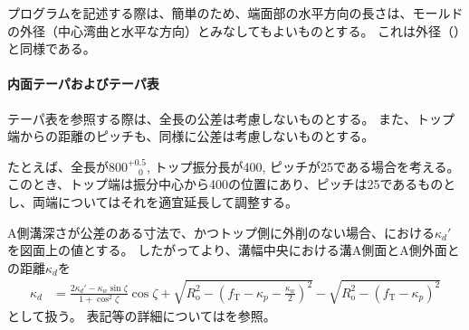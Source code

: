 プログラムを記述する際は、簡単のため、端面部の水平方向の長さは、モールドの外径（中心湾曲と水平な方向）とみなしてもよいものとする。
これは外径（）と同様である。

\paragraph*{内面テーパおよびテーパ表}
テーパ表を参照する際は、全長の公差は考慮しないものとする。
また、トップ端からの距離のピッチも、同様に公差は考慮しないものとする。

たとえば、全長が$800^{+0.5}_{\phantom -0}$, トップ振分長が400, ピッチが25である場合を考える。
このとき、トップ端は振分中心から400の位置にあり、ピッチは25であるものとし、両端についてはそれを適宜延長して調整する。



A側溝深さが公差のある寸法で、かつトップ側に外削のない場合、における$\kappa_d'$を図面上の値とする。
したがってより、溝幅中央における溝A側面とA側外面との距離$\kappa_d$を
\begin{align*}
  \kappa_d
  &= \frac{2\kappa_d'-\kappa_w\sin\zeta}{1+\cos^2\zeta}\cos\zeta
     +\sqrt{R_\mathrm o^2-\left(f_\mathrm T-\kappa_p-\frac{\kappa_w}2\right)^{\!2}}
     -\sqrt{R_\mathrm o^2-\left(f_\mathrm T-\kappa_p\right)^2}
\end{align*}
として扱う。
表記等の詳細についてはを参照。
